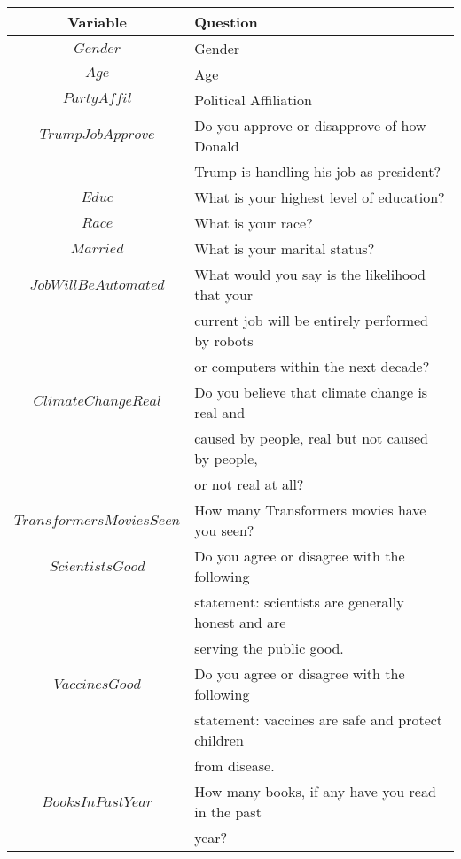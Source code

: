\begin{table}[h]
    \centering
    \begin{tabular}{|c|l|}
        \hline
        \textbf{Variable} & \textbf{Question} \\
        \hline
        $Gender$ & Gender\\
        \hline
        $Age$ & Age\\
        \hline
        $PartyAffil$ & Political Affiliation\\
        \hline
        $TrumpJobApprove$ & Do you approve or disapprove of how Donald\\
        & Trump is handling his job as president?\\
        \hline
        $Educ$ & What is your highest level of education?\\
        \hline
        $Race$ & What is your race?\\
        \hline
        $Married$ & What is your marital status?\\
        \hline
        $JobWillBeAutomated$ & What would you say is the likelihood that your\\
        & current job will be entirely performed by robots\\
        & or computers within the next decade?\\
        \hline
        $ClimateChangeReal$ & Do you believe that climate change is real and\\
        & caused by people, real but not caused by people,\\
        & or not real at all?\\
        \hline
        $TransformersMoviesSeen$ & How many Transformers movies have you seen?\\
        \hline
        $ScientistsGood$ & Do you agree or disagree with the following\\
        & statement: scientists are generally honest and are\\
        & serving the public good.\\
        \hline
        $VaccinesGood$ & Do you agree or disagree with the following\\ 
        & statement: vaccines are safe and protect children\\
        & from disease.\\
        \hline
        $BooksInPastYear$ & How many books, if any have you read in the past\\
        & year?\\

\end{tabular}
\end{table}
